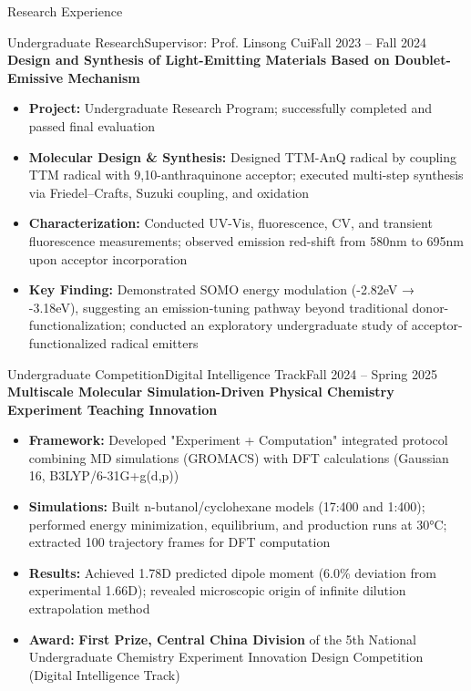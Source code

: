 \documentclass[]{mcdowellcv}
\begin{document}
\begin{cvsection}{Research Experience}
	\begin{cvsubsection}{Undergraduate Research}{Supervisor: Prof. Linsong Cui}{Fall 2023 -- Fall 2024}
		\textbf{Design and Synthesis of Light-Emitting Materials Based on Doublet-Emissive Mechanism}
		\begin{itemize}
			\item \textbf{Project:} Undergraduate Research Program; successfully completed and passed final evaluation
			\item \textbf{Molecular Design \& Synthesis:} Designed TTM-AnQ radical by coupling TTM radical with 9,10-anthraquinone acceptor; executed multi-step synthesis via Friedel–Crafts, Suzuki coupling, and oxidation
			\item \textbf{Characterization:} Conducted UV-Vis, fluorescence, CV, and transient fluorescence measurements; observed emission red-shift from 580nm to 695nm upon acceptor incorporation
			\item \textbf{Key Finding:} Demonstrated SOMO energy modulation (-2.82eV → -3.18eV), suggesting an emission-tuning pathway beyond traditional donor-functionalization; conducted an exploratory undergraduate study of acceptor-functionalized radical emitters
		\end{itemize}
	\end{cvsubsection}

	\begin{cvsubsection}{Undergraduate Competition}{Digital Intelligence Track}{Fall 2024 -- Spring 2025}
		\textbf{Multiscale Molecular Simulation-Driven Physical Chemistry Experiment Teaching Innovation}
		\begin{itemize}
			\item \textbf{Framework:} Developed "Experiment + Computation" integrated protocol combining MD simulations (GROMACS) with DFT calculations (Gaussian 16, B3LYP/6-31G+g(d,p))
			\item \textbf{Simulations:} Built n-butanol/cyclohexane models (17:400 and 1:400); performed energy minimization, equilibrium, and production runs at 30°C; extracted 100 trajectory frames for DFT computation
			\item \textbf{Results:} Achieved 1.78D predicted dipole moment (6.0\% deviation from experimental 1.66D); revealed microscopic origin of infinite dilution extrapolation method
			\item \textbf{Award:} \textbf{First Prize, Central China Division} of the 5th National Undergraduate Chemistry Experiment Innovation Design Competition (Digital Intelligence Track)
		\end{itemize}
	\end{cvsubsection}
\end{cvsection}
\end{document}
